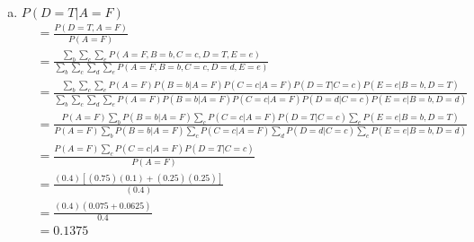 \documentclass[10pt,draftclsnofoot,onecolumn]{IEEEtran}
\begin{document}
\begin{enumerate}
\begin{enumerate}[a)]
    \item $ P(D=T | A=F) $
    \begin{align*}
      &= \frac{P(D=T,A=F)}{P(A=F)} \\
      &= \frac{\sum_{b} \sum_{c} \sum_{e} P(A=F,B=b,C=c,D=T,E=e)}
              {\sum_{b} \sum_{c} \sum_{d} \sum_{e} P(A=F,B=b,C=c,D=d,E=e)} \\
      &= \frac{\sum_{b} \sum_{c} \sum_{e} P(A=F)P(B=b|A=F)P(C=c|A=F)P(D=T|C=c)P(E=e|B=b,D=T)}
              {\sum_{b} \sum_{c} \sum_{d} \sum_{e} P(A=F)P(B=b|A=F)P(C=c|A=F)P(D=d|C=c)P(E=e|B=b,D=d)} \\
      &= \frac{P(A=F) \sum_{b} P(B=b|A=F) \sum_{c} P(C=c|A=F)P(D=T|C=c) \sum_{e} P(E=e|B=b,D=T)}
              {P(A=F) \sum_{b} P(B=b|A=F) \sum_{c} P(C=c|A=F) \sum_{d} P(D=d|C=c) \sum_{e} P(E=e|B=b,D=d)} \\
      &= \frac{P(A=F) \sum_{c} P(C=c|A=F)P(D=T|C=c)}
              {P(A=F)} \\
      &= \frac{(0.4)[(0.75)(0.1)+(0.25)(0.25)]}
              {(0.4)} \\
      &= \frac{(0.4)(0.075 + 0.0625)}{0.4} \\
      &= 0.1375 \\
    \end{align*}
  \end{enumerate}
\end{enumerate}
\end{document}

